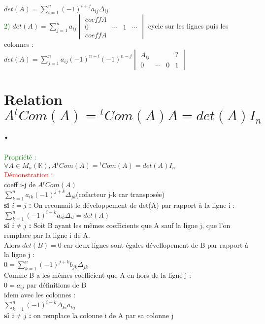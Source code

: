 \documentclass{article}
\begin{document}
    $det(A)=\sum_{i=1}^n (-1)^{i+j} a_{ij} \Delta_{ij}$ \\
    \textcolor{green}{2)} $det(A)= \sum_{j=1}^n a_{ij} \begin{vmatrix} coeff A \\ 0 & \cdots & 1 & \cdots \\ coeff A \end{vmatrix}$
    cycle sur les lignes puis les colonnes  : \\
    $det(A)=\sum_{j=1}^n a_{ij} (-1)^{n-i}(-1)^{n-j} \begin{vmatrix}A_{ij} & &  & ? \\ 0 & \cdots & 0 & 1\end{vmatrix}$

\section{Relation $A {}^tCom(A)={}^tCom(A)A=det(A)I_n$.}
      \textcolor{green}{Propriété :} \\
      $\forall A \in M_n(\mathbb K),  A {}^t Com(A)= {}^t Com(A)= det(A)I_n$ \\
      \textcolor{red}{Démonstration : } \\
      coeff i-j de $A{}^t Com(A)$ \\
      $\sum_{k=1}^n a_{ik} (-1)^{j+k} \Delta_{jk}$(cofacteur j-k car transposée) \\
      {\bf si \boldmath $i = j$ :} On reconnait le développement de det(A) par rapport à la ligne i : \\
      $\sum_{k=1}^n (-1)^{i+k}a_{ik}\Delta_{il}=det(A)$ \\
      {\bf si \boldmath $i \neq j$ :} Soit B ayant les mêmes coefficients  que A sauf la ligne j, que l'on remplace par la ligne i de A. \\
      Alors $det(B) = 0$ car deux lignes sont égales dévellopement de B par rapport à la ligne j : \\
      $0=\sum_{k=1}^n (-1)^{j+k} b_{jk} \Delta_{jk}$ \\
      Comme B a les mêmes coefficient que A en hors de la ligne j : \\
      $0=a_{ij}$ par définitions de B \\
      idem avec les colonnes : \\
      $\sum_{k=1}^n (-1)^{i+k} \Delta_{ki} a_{kj}$ \\
      {\bf \boldmath si $i\neq j$ :} on remplace la colonne i de A par sa colonne j
\end{document}
